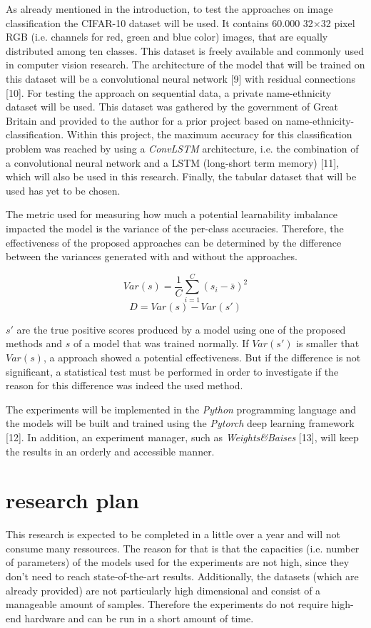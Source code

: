 \documentclass[journal]{IEEEtran}
\begin{document}
As already mentioned in the introduction, to test the approaches on image classification the CIFAR-10 dataset will be used.
It contains 60.000 32$\times$32 pixel RGB (i.e. channels for red, green and blue color) images, that are equally distributed among ten classes.
This dataset is freely available and commonly used in computer vision research.
The architecture of the model that will be trained on this dataset will be a convolutional neural network [9] with residual connections [10].
For testing the approach on sequential data, a private name-ethnicity dataset will be used.
This dataset was gathered by the government of Great Britain and provided to the author for a prior project based on name-ethnicity-classification.
Within this project, the maximum accuracy for this classification problem was reached by using a \emph{ConvLSTM} architecture, i.e. the combination of a convolutional neural network and a LSTM (long-short term memory) [11], which will also be used in this research. 
Finally, the tabular dataset that will be used has yet to be chosen.

The metric used for measuring how much a potential learnability imbalance impacted the model is the variance of the per-class accuracies.
Therefore, the effectiveness of the proposed approaches can be determined by the difference between the variances generated with and without the approaches.

\[ Var(s) = \frac{1}{C} \sum_{i=1}^{C} (s_i - \bar{s})^2 \]
\[ D = Var(s) - Var(s') \]

$s'$ are the true positive scores produced by a model using one of the proposed methods and $s$ of a model that was trained normally. 
If $Var(s')$ is smaller that $Var(s)$, a approach showed a potential effectiveness.
But if the difference is not significant, a statistical test must be performed in order to investigate if the reason for this difference was indeed the used method.

The experiments will be implemented in the \emph{Python} programming language and the models will be built and trained using the \emph{Pytorch} deep learning framework [12].
In addition, an experiment manager, such as \emph{Weights\&Baises} [13], will keep the results in an orderly and accessible manner.

\section{research plan}
This research is expected to be completed in a little over a year and will not consume many ressources.
The reason for that is that the capacities (i.e. number of parameters) of the models used for the experiments are not high, since they don't need to reach state-of-the-art results.
Additionally, the datasets (which are already provided) are not particularly high dimensional and consist of a manageable amount of samples.
Therefore the experiments do not require high-end hardware and can be run in a short amount of time.
\end{document}
